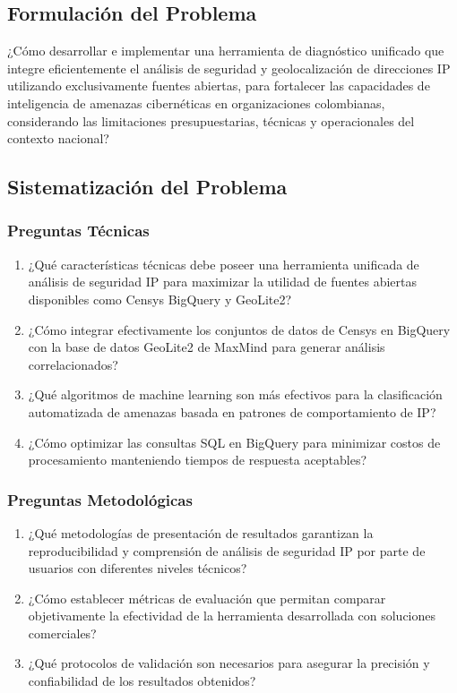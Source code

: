 \subsection{Formulación del Problema}
¿Cómo desarrollar e implementar una herramienta de diagnóstico unificado que integre eficientemente el análisis de seguridad y geolocalización de direcciones IP utilizando exclusivamente fuentes abiertas, para fortalecer las capacidades de inteligencia de amenazas cibernéticas en organizaciones colombianas, considerando las limitaciones presupuestarias, técnicas y operacionales del contexto nacional?

\subsection{Sistematización del Problema}

\subsubsection{Preguntas Técnicas}
\begin{enumerate}
    \item ¿Qué características técnicas debe poseer una herramienta unificada de análisis de seguridad IP para maximizar la utilidad de fuentes abiertas disponibles como Censys BigQuery y GeoLite2?
    \item ¿Cómo integrar efectivamente los conjuntos de datos de Censys en BigQuery con la base de datos GeoLite2 de MaxMind para generar análisis correlacionados?
    \item ¿Qué algoritmos de machine learning son más efectivos para la clasificación automatizada de amenazas basada en patrones de comportamiento de IP?
    \item ¿Cómo optimizar las consultas SQL en BigQuery para minimizar costos de procesamiento manteniendo tiempos de respuesta aceptables?
\end{enumerate}

\subsubsection{Preguntas Metodológicas}
\begin{enumerate}
    \item ¿Qué metodologías de presentación de resultados garantizan la reproducibilidad y comprensión de análisis de seguridad IP por parte de usuarios con diferentes niveles técnicos?
    \item ¿Cómo establecer métricas de evaluación que permitan comparar objetivamente la efectividad de la herramienta desarrollada con soluciones comerciales?
    \item ¿Qué protocolos de validación son necesarios para asegurar la precisión y confiabilidad de los resultados obtenidos?
\end{enumerate}

